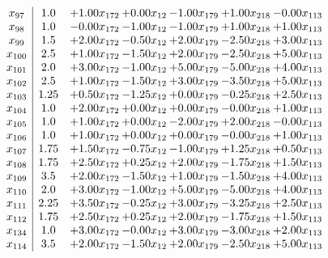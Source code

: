 \documentclass[8pt]{article}
\begin{document}
\[\begin{array}{c| c c@{\hskip 2pt} c@{\hskip 2pt} c@{\hskip 2pt} c@{\hskip 2pt} c@{\hskip 2pt} }
 x_{97}   &  1.0 & +  1.00 x_{172} & +  0.00 x_{12} & -1.00 x_{179} & +  1.00 x_{218} & -0.00 x_{113}\\
 x_{98}   &  1.0 & -0.00 x_{172} & -1.00 x_{12} & -1.00 x_{179} & +  1.00 x_{218} & +  1.00 x_{113}\\
 x_{99}   &  1.5 & +  2.00 x_{172} & -0.50 x_{12} & +  2.00 x_{179} & -2.50 x_{218} & +  3.00 x_{113}\\
 x_{100}   &  2.5 & +  1.00 x_{172} & -1.50 x_{12} & +  2.00 x_{179} & -2.50 x_{218} & +  5.00 x_{113}\\
 x_{101}   &  2.0 & +  3.00 x_{172} & -1.00 x_{12} & +  5.00 x_{179} & -5.00 x_{218} & +  4.00 x_{113}\\
 x_{102}   &  2.5 & +  1.00 x_{172} & -1.50 x_{12} & +  3.00 x_{179} & -3.50 x_{218} & +  5.00 x_{113}\\
 x_{103}   &  1.25 & +  0.50 x_{172} & -1.25 x_{12} & +  0.00 x_{179} & -0.25 x_{218} & +  2.50 x_{113}\\
 x_{104}   &  1.0 & +  2.00 x_{172} & +  0.00 x_{12} & +  0.00 x_{179} & -0.00 x_{218} & +  1.00 x_{113}\\
 x_{105}   &  1.0 & +  1.00 x_{172} & +  0.00 x_{12} & -2.00 x_{179} & +  2.00 x_{218} & -0.00 x_{113}\\
 x_{106}   &  1.0 & +  1.00 x_{172} & +  0.00 x_{12} & +  0.00 x_{179} & -0.00 x_{218} & +  1.00 x_{113}\\
 x_{107}   &  1.75 & +  1.50 x_{172} & -0.75 x_{12} & -1.00 x_{179} & +  1.25 x_{218} & +  0.50 x_{113}\\
 x_{108}   &  1.75 & +  2.50 x_{172} & +  0.25 x_{12} & +  2.00 x_{179} & -1.75 x_{218} & +  1.50 x_{113}\\
 x_{109}   &  3.5 & +  2.00 x_{172} & -1.50 x_{12} & +  1.00 x_{179} & -1.50 x_{218} & +  4.00 x_{113}\\
 x_{110}   &  2.0 & +  3.00 x_{172} & -1.00 x_{12} & +  5.00 x_{179} & -5.00 x_{218} & +  4.00 x_{113}\\
 x_{111}   &  2.25 & +  3.50 x_{172} & -0.25 x_{12} & +  3.00 x_{179} & -3.25 x_{218} & +  2.50 x_{113}\\
 x_{112}   &  1.75 & +  2.50 x_{172} & +  0.25 x_{12} & +  2.00 x_{179} & -1.75 x_{218} & +  1.50 x_{113}\\
 x_{134}   &  1.0 & +  3.00 x_{172} & -0.00 x_{12} & +  3.00 x_{179} & -3.00 x_{218} & +  2.00 x_{113}\\
 x_{114}   &  3.5 & +  2.00 x_{172} & -1.50 x_{12} & +  2.00 x_{179} & -2.50 x_{218} & +  5.00 x_{113}\\

\end{array}\]
\end{document}

